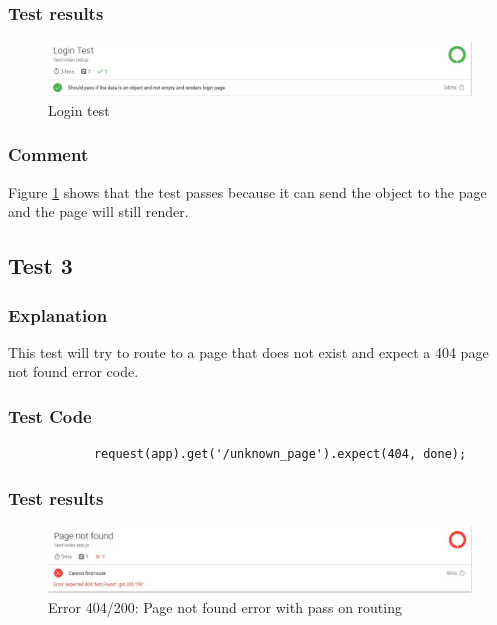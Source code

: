 \documentclass[]{article}
\begin{document}
		\subsubsection{Test results}
		\begin{figure}[h]
			\centering
		    \includegraphics[width=1\linewidth]{Graphics/MochaTest2.JPG}
			\caption{Login test}
			\label{fig:loginTest}
	 	\end{figure}
		
		\subsubsection{Comment}
		Figure \ref{fig:loginTest} shows that the test passes because it can send the object to the page and the page will still render.
		
	\subsection{Test 3}
		\subsubsection{Explanation}
		This test will try to route to a page that does not exist and expect a 404 page not found error code.
		\subsubsection{Test Code}	
		\begin{verbatim}
			request(app).get('/unknown_page').expect(404, done);
		\end{verbatim}
		\subsubsection{Test results}
		\begin{figure}[h]
			\centering
		    \includegraphics[width=1\linewidth]{Graphics/MochaTest3.JPG}
			\caption{Error 404/200: Page not found error with pass on routing}
			\label{fig:Error404/200}
	 	\end{figure}
\end{document}
